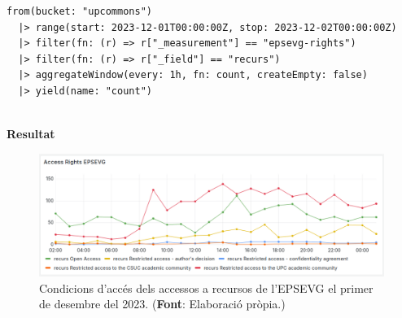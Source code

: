 \noindent
\begin{verbatim}
from(bucket: "upcommons")
  |> range(start: 2023-12-01T00:00:00Z, stop: 2023-12-02T00:00:00Z)
  |> filter(fn: (r) => r["_measurement"] == "epsevg-rights")
  |> filter(fn: (r) => r["_field"] == "recurs")
  |> aggregateWindow(every: 1h, fn: count, createEmpty: false)
  |> yield(name: "count")
\end{verbatim}

\clearpage

\noindent \\
\textbf{Resultat}

\begin{figure}[htbp]
    \centerline{\includegraphics[width=\textwidth]{figures/access-rights-epsevg}}
    \captionsetup{justification=centering}
    \caption[Condicions d'accés dels accessos a recursos de l'EPSEVG el primer de desembre del 2023.]{Condicions d'accés dels accessos a recursos de l'EPSEVG el primer de desembre del 2023. (\textbf{Font}: Elaboració pròpia.)}\label{fig:log-access-type}
\end{figure}

